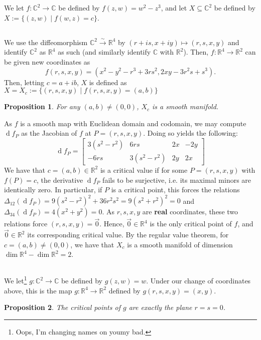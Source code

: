 \documentclass[english]{article}
\let\avec=\vec
\renewcommand\vec{\mathbf}
\renewcommand{\d}[1]{\ensuremath{\operatorname{d}\!{#1}}}
\newcommand{\RR}{\mathbb{R}}
\newcommand{\CC}{\mathbb{C}}
\newcommand{\prob}[1]{\setcounter{section}{#1-1}\section{}}
\newcommand{\prt}[1]{\setcounter{subsection}{#1-1}\subsection{}}
\newtheorem*{proposition*}{Proposition}
\theoremstyle{remark}
\theoremstyle{definition}
\newcommand{\tosm}{\xrightarrow{\sim}}
\begin{document}
\prob{2}
We let $f:\CC^2\to \CC$ be defined by $f(z,w)=w^2-z^3$, and let $X\subseteq \CC^2$ be defined by $X:=\{(z,w)\mid f(w,z)=c\}$.
\prt{1}
We use the diffeomorphism $\CC^2\tosm \RR^4$ by $(r+is,x+iy)\mapsto (r,s,x,y)$ and identify $\CC^2$ as $\RR^4$ as such (and similarly identify $\CC$ with $\RR^2$). Then, $f:\RR^4\to \RR^2$ can be given new coordinates as \[f(r,s,x,y)=(x^2-y^2-r^3+3rs^2,2xy-3r^2s+s^3).\] Then, letting $c=a+ib$, $X$ is defined as $X=X_c:=\{(r,s,x,y)\mid f(r,s,x,y)=(a,b)\}$
\begin{proposition*}
	For any $(a,b)\neq (0,0)$, $X_c$ is a smooth manifold.
\end{proposition*}
 As $f$ is a smooth map with Euclidean domain and codomain, we may compute $\d f_{P}$ as the Jacobian of $f$ at $P=(r,s,x,y)$. Doing so yields the following:
\[\d f_P=\begin{bmatrix}
3(s^2-r^2)&6rs&2x&-2y\\
-6rs&3(s^2-r^2)&2y&2x
\end{bmatrix}\]  
We have that $c=(a,b)\in \RR^2$ is a critical value if for some $P=(r,s,x,y)$ with $f(P)=c$, the derivative $\d f_P$ fails to be surjective, i.e. its maximal minors are identically zero. In particular, if $P$ is a critical point, this forces the relations $\Delta_{12}(\d f_P)=9(s^2-r^2)^2+36r^2s^2=9(s^2+r^2)^2=0$ and $\Delta_{34}(\d f_P)=4(x^2+y^2)=0$. As $r,s,x,y$ are \textbf{real} coordinates, these two relations force $(r,s,x,y)=\avec{0}$. Hence, $\avec{0}\in \RR^4$ is the only critical point of $f$, and $\avec{0}\in \RR^2$ its corresponding critical value. By the regular value theorem, for $c=(a,b)\neq (0,0)$, we have that $X_c$ is a smooth manifold of dimension $\dim \RR^4-\dim \RR^2=2$.
\prt{2}
We let\footnote{Oops, I'm changing names on you\textemdash my bad.} $g:\CC^2\to \CC$ be defined by $g(z,w)=w$. Under our change of coordinates above, this is the map $g:\RR^4\to \RR^2$ defined by $g(r,s,x,y)=(x,y)$. 
\begin{proposition*}
	The critical points of $g$ are exactly the plane $r=s=0$. 
\end{proposition*}
\end{document}
